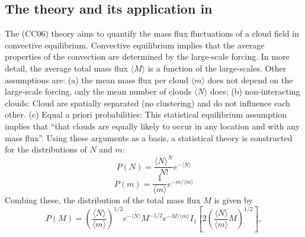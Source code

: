 \documentclass[a4paper, 12pt]{article}
\begin{document}

\subsection{The \cite{Craig2006} theory and its application in \cite{Plant2008}} 
The \cite{Craig2006}(CC06) theory aims to quantify the mass flux fluctuations of a cloud field in convective equilibrium. Convective equilibrium implies that the average properties of the convection are determined by the large-scale forcing. In more detail, the average total mass flux $\langle M \rangle$ is a function of the large-scales. Other assumptions are: (a) the mean mass flux per cloud $\langle m \rangle$ does not depend on the large-scale forcing, only the mean number of clouds $\langle N \rangle$ does; (b) non-interacting clouds: Cloud are spatially separated (no clustering) and do not influence each other. (c) Equal a priori probabilities: This statistical equilibrium assumption implies that ``that clouds are equally likely to occur in any location and with any mass flux''. Using these arguments as a basis, a statistical theory is constructed for the distributions of $N$ and $m$:
\begin{equation} \label{eq:N_dist}
 P(N) = \frac{\langle N \rangle^N}{N!}e^{-\langle N \rangle}
\end{equation}
\begin{equation} \label{eq:m_dist}
 P(m) = \frac{1}{\langle m \rangle}e^{-m/\langle m \rangle}
\end{equation}
Combing these, the distribution of the total mass flux $M$ is given by
\begin{equation} \label{eq:M_dist}
 P(M) = \left( \frac{\langle N \rangle}{\langle m \rangle} \right)^{1/2} e^{-\langle N \rangle} M^{-1/2} e^{-M/\langle m \rangle} I_1\left[ 2 \left( \frac{\langle N \rangle}{\langle m \rangle} M \right)^{1/2} \right],
\end{equation}
\end{document}
